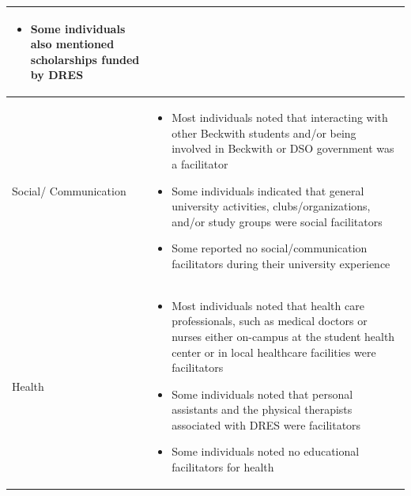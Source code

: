 \documentclass[11.5pt]{sig-alternate} %
\begin{document}
\begin{large}
\begin{table}[th]
\begin{tabular}{|l|l|}
\begin{itemize}[noitemsep, topsep=0pt, leftmargin=*]
    \item Some individuals also mentioned scholarships funded by DRES
    \end{itemize} \\ \hline
    Social/ Communication &
    \begin{itemize}[noitemsep, topsep=0pt, leftmargin=*]
    \item Most individuals noted that interacting with other Beckwith students and/or being involved in Beckwith or DSO government was a facilitator
    \item Some individuals indicated that general university activities, clubs/organizations, and/or study groups were social facilitators
    \item Some reported no social/communication facilitators during their university experience
    \end{itemize} \\ \hline
    Health &
    \begin{itemize}[noitemsep, topsep=0pt, leftmargin=*]
    \item Most individuals noted that health care professionals, such as medical doctors or nurses either on-campus at the student health center or in local healthcare facilities were facilitators
    \item Some individuals noted that personal assistants and the physical therapists associated with DRES were facilitators
    \item Some individuals noted no educational facilitators for health
    \end{itemize} \\ \hline
    \end{tabular}
    \end{table}


\end{large}
\end{document}
